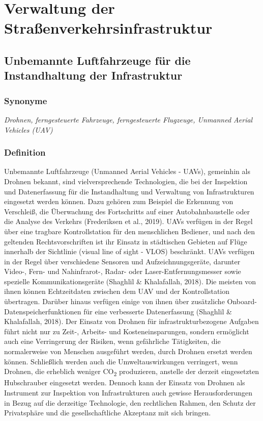 \documentclass[
]{book}
\begin{document}
\hypertarget{highway}{%
\chapter{Verwaltung der Straßenverkehrsinfrastruktur}\label{highway}}

\hypertarget{uav}{%
\section{Unbemannte Luftfahrzeuge für die Instandhaltung der Infrastruktur}\label{uav}}

\hypertarget{synonyme-6}{%
\subsection*{Synonyme}\label{synonyme-6}}

\emph{Drohnen, ferngesteuerte Fahrzeuge, ferngesteuerte Flugzeuge, Unmanned Aerial Vehicles (UAV)}

\hypertarget{definition-7}{%
\subsection*{Definition}\label{definition-7}}

Unbemannte Luftfahrzeuge (Unmanned Aerial Vehicles - UAVs), gemeinhin als Drohnen bekannt, sind vielversprechende Technologien, die bei der Inspektion und Datenerfassung für die Instandhaltung und Verwaltung von Infrastrukturen eingesetzt werden können. Dazu gehören zum Beispiel die Erkennung von Verschleiß, die Überwachung des Fortschritts auf einer Autobahnbaustelle oder die Analyse des Verkehrs (Frederiksen et al., 2019). UAVs verfügen in der Regel über eine tragbare Kontrollstation für den menschlichen Bediener, und nach den geltenden Rechtsvorschriften ist ihr Einsatz in städtischen Gebieten auf Flüge innerhalb der Sichtlinie (visual line of sight - VLOS) beschränkt. UAVs verfügen in der Regel über verschiedene Sensoren und Aufzeichnungsgeräte, darunter Video-, Fern- und Nahinfrarot-, Radar- oder Laser-Entfernungsmesser sowie spezielle Kommunikationsgeräte (Shaghlil \& Khalafallah, 2018). Die meisten von ihnen können Echtzeitdaten zwischen dem UAV und der Kontrollstation übertragen. Darüber hinaus verfügen einige von ihnen über zusätzliche Onboard-Datenspeicherfunktionen für eine verbesserte Datenerfassung (Shaghlil \& Khalafallah, 2018). Der Einsatz von Drohnen für infrastrukturbezogene Aufgaben führt nicht nur zu Zeit-, Arbeits- und Kosteneinsparungen, sondern ermöglicht auch eine Verringerung der Risiken, wenn gefährliche Tätigkeiten, die normalerweise von Menschen ausgeführt werden, durch Drohnen ersetzt werden können. Schließlich werden auch die Umweltauswirkungen verringert, wenn Drohnen, die erheblich weniger CO\textsubscript{2} produzieren, anstelle der derzeit eingesetzten Hubschrauber eingesetzt werden. Dennoch kann der Einsatz von Drohnen als Instrument zur Inspektion von Infrastrukturen auch gewisse Herausforderungen in Bezug auf die derzeitige Technologie, den rechtlichen Rahmen, den Schutz der Privatsphäre und die gesellschaftliche Akzeptanz mit sich bringen.
\end{document}
